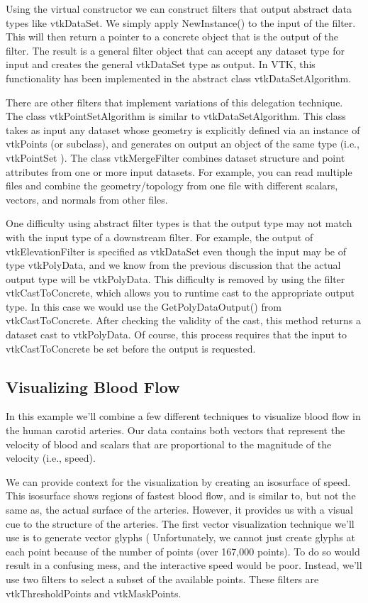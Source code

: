 Using the virtual constructor we can construct filters that output abstract data types like vtkDataSet. We simply apply NewInstance() to the input of the filter. This will then return a pointer to a concrete object that is the output of the filter. The result is a general filter object that can accept any dataset type for input and creates the general vtkDataSet type as output. In VTK, this functionality has been implemented in the abstract class vtkDataSetAlgorithm.

There are other filters that implement variations of this delegation technique. The class vtkPointSetAlgorithm is similar to vtkDataSetAlgorithm. This class takes as input any dataset whose geometry is explicitly defined via an instance of vtkPoints (or subclass), and generates on output an object of the same type (i.e., vtkPointSet ). The class vtkMergeFilter combines dataset structure and point attributes from one or more input datasets. For example, you can read multiple files and combine the geometry/topology from one file with different scalars, vectors, and normals from other files.

One difficulty using abstract filter types is that the output type may not match with the input type of a downstream filter. For example, the output of vtkElevationFilter is specified as vtkDataSet even though the input may be of type vtkPolyData, and we know from the previous discussion that the actual output type will be vtkPolyData. This difficulty is removed by using the filter vtkCastToConcrete, which allows you to runtime cast to the appropriate output type. In this case we would use the GetPolyDataOutput() from vtkCastToConcrete. After checking the validity of the cast, this method returns a dataset cast to vtkPolyData. Of course, this process requires that the input to vtkCastToConcrete be set before the output is requested.

\subsection{Visualizing Blood Flow}

In this example we'll combine a few different techniques to visualize blood flow in the human carotid arteries. Our data contains both vectors that represent the velocity of blood and scalars that are proportional to the magnitude of the velocity (i.e., speed).

We can provide context for the visualization by creating an isosurface of speed. This isosurface shows regions of fastest blood flow, and is similar to, but not the same as, the actual surface of the arteries. However, it provides us with a visual cue to the structure of the arteries. The first vector visualization technique we'll use is to generate vector glyphs ( Unfortunately, we cannot just create glyphs at each point because of the number of points (over 167,000 points). To do so would result in a confusing mess, and the interactive speed would be poor. Instead, we'll use two filters to select a subset of the available points. These filters are vtkThresholdPoints and vtkMaskPoints.

